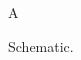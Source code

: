 \documentclass{article}
\begin{document}
\begin{figure}A\caption{Schematic.}\end{figure}
\end{document}
